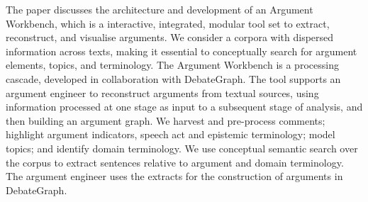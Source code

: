 The paper discusses the architecture and development of an Argument Workbench, which is a interactive, integrated, modular tool set to extract, reconstruct, and visualise arguments.  We consider a corpora with dispersed information across texts, making it essential to conceptually search for argument elements, topics, and terminology.  The Argument Workbench is a processing cascade, developed in collaboration with DebateGraph.  The tool supports an argument engineer to reconstruct arguments from textual sources, using information processed at one stage as input to a subsequent stage of analysis, and then building an argument graph.  We harvest and pre-process comments; highlight argument indicators, speech act and epistemic terminology; model topics; and identify domain terminology.  We use conceptual semantic search over the corpus to extract sentences relative to argument and domain terminology.  The argument engineer uses the extracts for the construction of arguments in DebateGraph.
